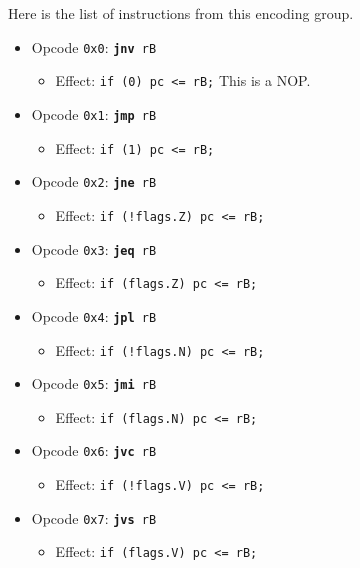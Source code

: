\documentclass{article}
\begin{document}
	Here is the list of instructions from this encoding group.

	\singlespacing
	\begin{itemize}
		\item Opcode \texttt{0x0}:
			\texttt{\textbf{jnv} rB}
		\begin{itemize}
			\item Effect:
				\texttt{if (0) pc <= rB;} This is a NOP.
		\end{itemize}

		\item Opcode \texttt{0x1}:
			\texttt{\textbf{jmp} rB}
		\begin{itemize}
			\item Effect:
				\texttt{if (1) pc <= rB;}
		\end{itemize}

		\item Opcode \texttt{0x2}:
			\texttt{\textbf{jne} rB}
		\begin{itemize}
			\item Effect:
				\texttt{if (!flags.Z) pc <= rB;}
		\end{itemize}

		\item Opcode \texttt{0x3}:
			\texttt{\textbf{jeq} rB}
		\begin{itemize}
			\item Effect:
				\texttt{if (flags.Z) pc <= rB;}
		\end{itemize}

		\item Opcode \texttt{0x4}:
			\texttt{\textbf{jpl} rB}
		\begin{itemize}
			\item Effect:
				\texttt{if (!flags.N) pc <= rB;}
		\end{itemize}

		\item Opcode \texttt{0x5}:
			\texttt{\textbf{jmi} rB}
		\begin{itemize}
			\item Effect:
				\texttt{if (flags.N) pc <= rB;}
		\end{itemize}

		\item Opcode \texttt{0x6}:
			\texttt{\textbf{jvc} rB}
		\begin{itemize}
			\item Effect:
				\texttt{if (!flags.V) pc <= rB;}
		\end{itemize}

		\item Opcode \texttt{0x7}:
			\texttt{\textbf{jvs} rB}
		\begin{itemize}
			\item Effect:
				\texttt{if (flags.V) pc <= rB;}
		\end{itemize}


\end{itemize}
\end{document}
